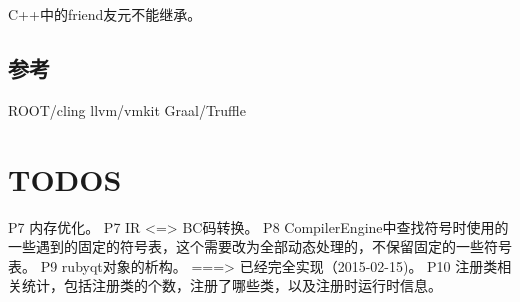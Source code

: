 C++中的friend友元不能继承。

\section{参考}
ROOT/cling
llvm/vmkit
Graal/Truffle

\chapter{TODOS}
P7  内存优化。
P7  IR <=> BC码转换。
P8  CompilerEngine中查找符号时使用的一些遇到的固定的符号表，这个需要改为全部动态处理的，不保留固定的一些符号表。
P9  rubyqt对象的析构。 ===> 已经完全实现（2015-02-15)。
P10 注册类相关统计，包括注册类的个数，注册了哪些类，以及注册时运行时信息。

